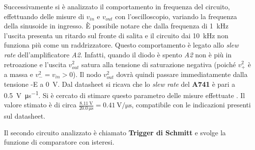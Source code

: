 \noindent
Successivamente si è analizzato il comportamento in frequenza del circuito, effettuando delle misure di $v_{in}$ e $v_{out}$ con l'oscilloscopio, variando la frequenza della sinusoide in ingresso. 
\`E possibile notare che dalla frequenza di \SI{1}{\kilo\hertz} l'uscita presenta un ritardo sul fronte di salita e il circuito dai \SI{10}{\kilo\hertz} non funziona più come un raddrizzatore. Questo comportamento è legato allo \textit{slew rate} dell'amplificatore \textit{A2}. Infatti, quando il diodo è spento \textit{A2} non è più in retroazione e l'uscita $v_{out}^2$ satura alla tensione di saturazione negativa (poiché $v_+^2$ è a massa e $v_-^2=v_{in}>0$). Il nodo $v_{out}^2$ dovrà quindi passare immediatamente dalla tensione -E a \SI{0}{\volt}. Dal datasheet si ricava che lo \textit{slew rate} del \textbf{\textmu A741} è pari a \SI{0.5}{\volt\per\micro\second}. Si è cercato di stimare questo parametro delle misure effettuate . Il valore stimato è di circa $\frac{\SI{8.11}{\volt}}{\SI{20.0}{\micro\second}}=\SI{0.41}{\volt\per\micro\second}$, compatibile con le indicazioni presenti sul datasheet.

\clearpage
Il secondo circuito analizzato è chiamato \textbf{Trigger di Schmitt} e svolge la funzione di comparatore con isteresi. 
